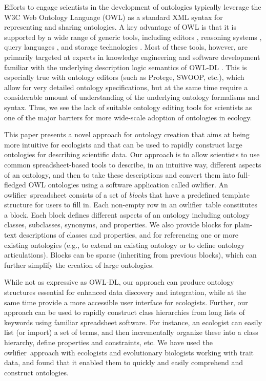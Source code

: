 \documentclass[preprint,number]{elsarticle}
\newcommand{\owlifier}{\textsf{owlifier}}
\begin{document}
Efforts to engage scientists in the development of ontologies
typically leverage the W3C Web Ontology Language (OWL)
\cite{smith04:_owl_web_ontol_languag_guide} as a standard XML syntax
for representing and sharing ontologies. A key advantage of OWL is
that it is supported by a wide range of generic tools, including
editors
\cite{knublauch04:_editin_descr_logic_ontol_with,kalyanpur05:_swoop},
reasoning systems
\cite{sirin07:_pellet,tsarkov06:_fact_descr_logic_reason}, query
languages
\cite{prudhommeaux08:_sparq_query_languag_for_rdf,motik05:_query_answer_for_owl_dl_with_rules},
and storage technologies
\cite{carroll04:_jena,broekstra02:_sesam}. Most of these tools,
however, are primarily targeted at experts in knowledge engineering
and software development familiar with the underlying description
logic semantics of OWL-DL \cite{grau08:_owl}. This is especially true
with ontology editors (such as Protege, SWOOP, etc.), which allow for
very detailed ontology specifications, but at the same time require a
considerable amount of understanding of the underlying ontology
formalisms and syntax. Thus, we see the lack of suitable ontology
editing tools for scientists as one of the major barriers for more
wide-scale adoption of ontologies in ecology.


This paper presents a novel approach for ontology creation that aims
at being more intuitive for ecologists and that can be used to rapidly
construct large ontologies for describing scientific data. Our
approach is to allow scientists to use common spreadsheet-based tools
to describe, in an intuitive way, different aspects of an ontology,
and then to take these descriptions and convert them into full-fledged
OWL ontologies using a software application called \owlifier. An
\owlifier\ spreadsheet consists of a set of \emph{blocks} that have a
predefined template structure for users to fill in. Each non-empty row
in an \owlifier\ table constitutes a block. Each block defines
different aspects of an ontology including ontology classes,
subclasses, synonyms, and properties.  We also provide blocks for
plain-text descriptions of classes and properties, and for referencing
one or more existing ontologies (e.g., to extend an existing ontology
or to define ontology articulations). Blocks can be sparse (inheriting
from previous blocks), which can further simplify the creation of
large ontologies.

While not as expressive as OWL-DL, our approach can produce ontology
structures essential for enhanced data discovery and integration,
while at the same time provide a more accessible user interface for
ecologists. Further, our approach can be used to rapidly construct
class hierarchies from long lists of keywords using familiar
spreadsheet software. For instance, an ecologist can easily list (or
import) a set of terms, and then incrementally organize these into a
class hierarchy, define properties and constraints, etc. We have used
the \owlifier\ approach with ecologists and evolutionary biologists
working with trait data, and found that it enabled them to quickly and
easily comprehend and construct ontologies.
\end{document}
